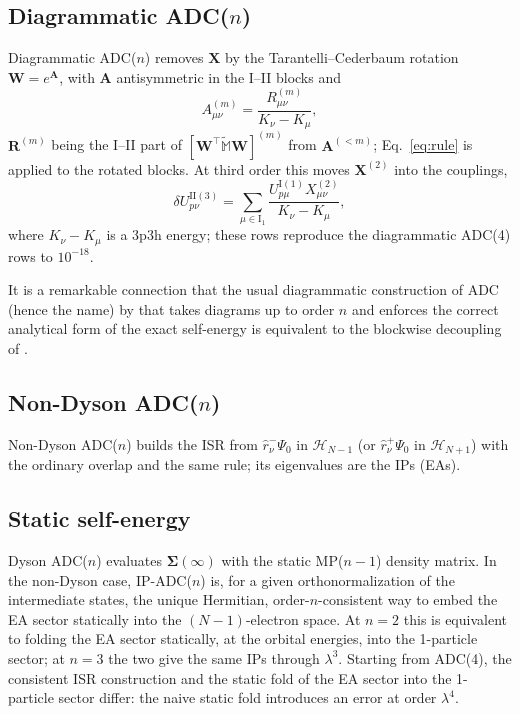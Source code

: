 \documentclass[aip,jcp,reprint,noshowkeys,superscriptaddress]{revtex4-1}
\newcommand{\la}{\lambda}
\newcommand{\tM}{\tilde{\mathbb{M}}}
\newcommand{\I}{\mathrm{I}}
\newcommand{\II}{\mathrm{II}}
\begin{document}
\subsection{Diagrammatic ADC(\texorpdfstring{$n$}{n})}
\label{sec:diagrammatic}

Diagrammatic ADC($n$) removes $\mathbf X$ by the Tarantelli--Cederbaum
rotation\cite{tarantelli1992configuration} $\mathbf W=e^{\mathbf A}$, with $\mathbf A$ antisymmetric in the
I--II blocks and
\begin{equation}
A^{(m)}_{\mu\nu} = \frac{R^{(m)}_{\mu\nu}}{K_\nu-K_\mu} ,
\end{equation}
$\mathbf R^{(m)}$ being the I--II part of $[\mathbf W^\intercal\tM\mathbf W]^{(m)}$ from
$\mathbf A^{(<m)}$; Eq.~\eqref{eq:rule} is applied to the rotated blocks. At third order this moves
$\mathbf X^{(2)}$ into the couplings,
\begin{equation}
\delta U^{\II(3)}_{p\nu} = \sum_{\mu\in\I_1}\frac{U^{\I(1)}_{p\mu}X^{(2)}_{\mu\nu}}{K_\nu-K_\mu} ,
\end{equation}
where $K_\nu-K_\mu$ is a 3p3h energy; these rows reproduce the diagrammatic ADC(4)
rows\cite{Schirmer_1983} to $10^{-18}$.

It is a remarkable connection that the usual diagrammatic construction of ADC (hence the name) by \citet{Schirmer_1983}
that takes diagrams up to order $n$ and enforces the correct analytical form of the exact self-energy 
is equivalent to the blockwise decoupling of \citet{tarantelli1992configuration}.

\subsection{Non-Dyson ADC(\texorpdfstring{$n$}{n})}

Non-Dyson ADC($n$)\cite{Schirmer_1998,Trofimov_2005}
builds the ISR from $\hat r^{-}_\nu\Psi_0$ in $\mathcal H_{N-1}$ (or $\hat r^{+}_\nu\Psi_0$ in
$\mathcal H_{N+1}$) with the ordinary overlap and the same rule; its eigenvalues are the IPs (EAs).

\subsection{Static self-energy}
Dyson ADC($n$) evaluates $\bm\Sigma(\infty)$ with the static MP($n-1$) density matrix.
In the non-Dyson case, IP-ADC($n$) is, for a given orthonormalization of the intermediate states, the unique
Hermitian, order-$n$-consistent way to embed the EA sector statically into the $(N-1)$-electron space. At $n=2$
this is equivalent to folding the EA sector statically, at the orbital energies, into the 1-particle sector;
at $n=3$ the two give the same IPs through $\la^3$.
Starting from ADC(4), the consistent ISR construction and the static fold of the EA sector into the 1-particle
sector differ: the naive static fold introduces an error at order $\la^4$.
\end{document}
